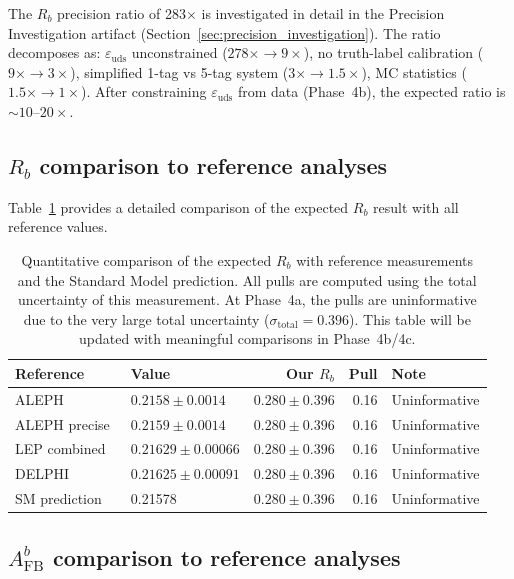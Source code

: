 \documentclass[11pt,a4paper]{article}
\begin{document}
The $R_b$ precision ratio of 283$\times$ is investigated in detail in the Precision
Investigation artifact (Section~\ref{sec:precision_investigation}). The ratio decomposes
as: $\varepsilon_\mathrm{uds}$ unconstrained ($278\times \to 9\times$), no truth-label
calibration ($9\times \to 3\times$), simplified 1-tag vs 5-tag system ($3\times \to 1.5\times$),
MC statistics ($1.5\times \to 1\times$). After constraining $\varepsilon_\mathrm{uds}$
from data (Phase~4b), the expected ratio is $\sim 10$--$20\times$.

\subsection{$R_b$ comparison to reference analyses}
\label{sec:rb_comparison_detail}

Table~\ref{tab:rb_comparison} provides a detailed comparison of the expected $R_b$
result with all reference values.

\begin{table}[htbp]
\centering
\caption{Quantitative comparison of the expected $R_b$ with reference measurements
and the Standard Model prediction. All pulls are computed using the total uncertainty
of this measurement. At Phase~4a, the pulls are uninformative due to the very large
total uncertainty ($\sigma_\mathrm{total} = 0.396$). This table will be updated with
meaningful comparisons in Phase~4b/4c.}
\label{tab:rb_comparison}
\begin{tabular}{llrrl}
\toprule
Reference & Value & Our $R_b$ & Pull & Note \\
\midrule
ALEPH~\cite{ALEPH:Rb:1996} & $0.2158 \pm 0.0014$ & $0.280 \pm 0.396$ & 0.16 & Uninformative \\
ALEPH precise~\cite{ALEPH:Rb:precise} & $0.2159 \pm 0.0014$ & $0.280 \pm 0.396$ & 0.16 & Uninformative \\
LEP combined~\cite{LEP:EWWG:2005} & $0.21629 \pm 0.00066$ & $0.280 \pm 0.396$ & 0.16 & Uninformative \\
DELPHI~\cite{DELPHI:Rb} & $0.21625 \pm 0.00091$ & $0.280 \pm 0.396$ & 0.16 & Uninformative \\
SM prediction~\cite{LEP:EWWG:2005} & 0.21578 & $0.280 \pm 0.396$ & 0.16 & Uninformative \\
\bottomrule
\end{tabular}
\end{table}

\subsection{$A_\mathrm{FB}^b$ comparison to reference analyses}
\label{sec:afb_comparison_detail}
\end{document}
